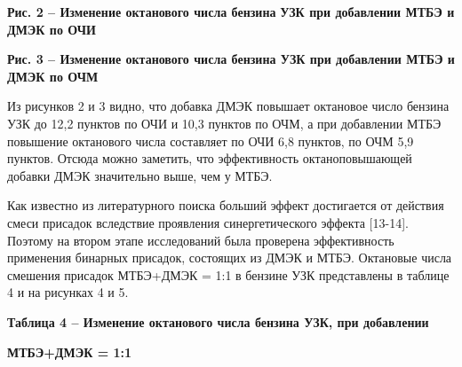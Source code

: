% 

{\bfseries Рис. 2 -- Изменение октанового числа бензина} {\bfseries УЗК при
добавлении МТБЭ и ДМЭК по ОЧИ}

{\bfseries Рис. 3 -- Изменение октанового числа бензина УЗК при добавлении
МТБЭ и ДМЭК по ОЧМ}

Из рисунков 2 и 3 видно, что добавка ДМЭК повышает октановое число
бензина УЗК до 12,2 пунктов по ОЧИ и 10,3 пунктов по ОЧМ, а при
добавлении МТБЭ повышение октанового числа составляет по ОЧИ 6,8
пунктов, по ОЧМ 5,9 пунктов. Отсюда можно заметить, что эффективность
октаноповышающей добавки ДМЭК значительно выше, чем у МТБЭ.

Как известно из литературного поиска больший эффект достигается от
действия смеси при­садок вследствие проявления синергетического эф­фекта
{[}13-14{]}. Поэтому на втором этапе исследований была проверена
эффективность применения бинарных присадок, состоящих из ДМЭК и МТБЭ.
Октановые числа смешения присадок МТБЭ+ДМЭК = 1:1 в бензине УЗК
представлены в таблице 4 и на рисунках 4 и 5.

{\bfseries Таблица 4 -- Изменение октанового числа бензина УЗК, при
добавлении}

{\bfseries МТБЭ+ДМЭК = 1:1}

